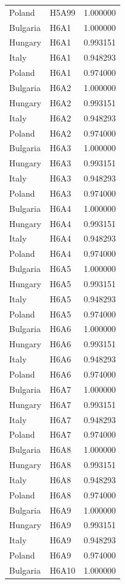 \begin{tabular}{llr}
Poland & H5A99 & 1.000000 \\
Bulgaria & H6A1 & 1.000000 \\
Hungary & H6A1 & 0.993151 \\
Italy & H6A1 & 0.948293 \\
Poland & H6A1 & 0.974000 \\
Bulgaria & H6A2 & 1.000000 \\
Hungary & H6A2 & 0.993151 \\
Italy & H6A2 & 0.948293 \\
Poland & H6A2 & 0.974000 \\
Bulgaria & H6A3 & 1.000000 \\
Hungary & H6A3 & 0.993151 \\
Italy & H6A3 & 0.948293 \\
Poland & H6A3 & 0.974000 \\
Bulgaria & H6A4 & 1.000000 \\
Hungary & H6A4 & 0.993151 \\
Italy & H6A4 & 0.948293 \\
Poland & H6A4 & 0.974000 \\
Bulgaria & H6A5 & 1.000000 \\
Hungary & H6A5 & 0.993151 \\
Italy & H6A5 & 0.948293 \\
Poland & H6A5 & 0.974000 \\
Bulgaria & H6A6 & 1.000000 \\
Hungary & H6A6 & 0.993151 \\
Italy & H6A6 & 0.948293 \\
Poland & H6A6 & 0.974000 \\
Bulgaria & H6A7 & 1.000000 \\
Hungary & H6A7 & 0.993151 \\
Italy & H6A7 & 0.948293 \\
Poland & H6A7 & 0.974000 \\
Bulgaria & H6A8 & 1.000000 \\
Hungary & H6A8 & 0.993151 \\
Italy & H6A8 & 0.948293 \\
Poland & H6A8 & 0.974000 \\
Bulgaria & H6A9 & 1.000000 \\
Hungary & H6A9 & 0.993151 \\
Italy & H6A9 & 0.948293 \\
Poland & H6A9 & 0.974000 \\
Bulgaria & H6A10 & 1.000000 \\

\end{tabular}

